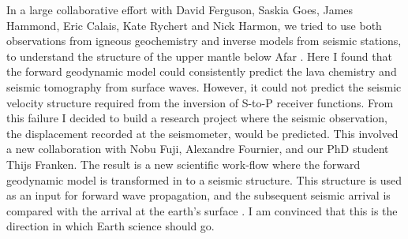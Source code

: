 In a large collaborative effort with David Ferguson, Saskia Goes, James Hammond, Eric Calais, Kate Rychert and Nick Harmon, we tried to use both observations from igneous geochemistry and inverse models from seismic stations, to understand the structure of the upper mantle below Afar \citep{armitage-etal-epsl-2015}. Here I found that the forward geodynamic model could consistently predict the lava chemistry and seismic tomography from surface waves. However, it could not predict the seismic velocity structure required from the inversion of S-to-P receiver functions. From this failure I decided to build a research project where the seismic observation, the displacement recorded at the seismometer, would be predicted. This involved a new collaboration with Nobu Fuji, Alexandre Fournier, and our PhD student Thijs Franken. The result is a new scientific work-flow where the forward geodynamic model is transformed in to a seismic structure. This structure is used as an input for forward wave propagation, and the subsequent seismic arrival is compared with the arrival at the earth's surface \citep{franken-etal-2020}. I am convinced that this is the direction in which Earth science should go.

